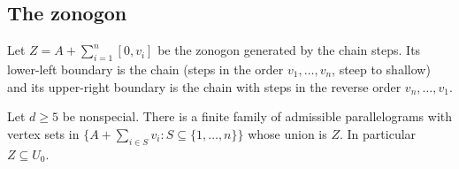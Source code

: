 \subsection{The zonogon}

Let $Z=A+\sum_{i=1}^n[0,v_i]$ be the zonogon generated by the chain steps. Its lower-left boundary is the chain (steps in the order $v_1,\dots,v_n$, steep to shallow) and its upper-right boundary is the chain with steps in the reverse order $v_n,\dots,v_1$.

\begin{lemma}\label{lem:zonogon}
Let $d\ge5$ be nonspecial. There is a finite family of admissible parallelograms with vertex sets in $\{A+\sum_{i\in S}v_i:S\subseteq\{1,\dots,n\}\}$ whose union is $Z$. In particular $Z\subseteq U_0$.
\end{lemma}
